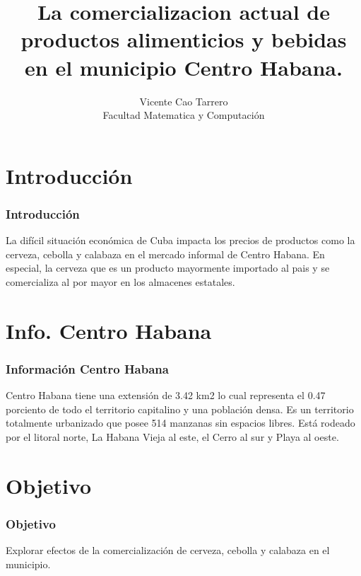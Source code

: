 \documentclass{beamer}
\title{La comercializacion actual de productos alimenticios y bebidas en el municipio  Centro Habana.}
\author{Vicente Cao Tarrero\\Facultad Matematica y Computación}
\begin{document}
\begin{frame}
\titlepage{}
\end{frame}

\newpage

\begin{frame}
\tableofcontents
\end{frame}

\section{Introducción}
\begin{frame}
\frametitle{Introducción}

La difícil situación económica de Cuba impacta los precios de productos como la cerveza, cebolla y calabaza en el mercado informal de Centro Habana. En especial, la cerveza que es un producto mayormente importado al pais y se comercializa al por mayor en los almacenes estatales.

\end{frame}

\section{Info. Centro Habana}
\begin{frame}
\frametitle{Información Centro Habana}

Centro Habana tiene una extensión de 3.42 km2 lo cual representa el 0.47 porciento de todo el territorio capitalino y una población densa. Es un territorio totalmente urbanizado que posee 514 manzanas sin espacios libres. Está rodeado por el litoral norte, La Habana Vieja al este, el Cerro al sur y Playa al oeste.

\end{frame}

\section{Objetivo}
\begin{frame}
\frametitle{Objetivo}

Explorar efectos de la comercialización de cerveza, cebolla y calabaza en el municipio.

\end{frame}

\newpage
\end{document}
